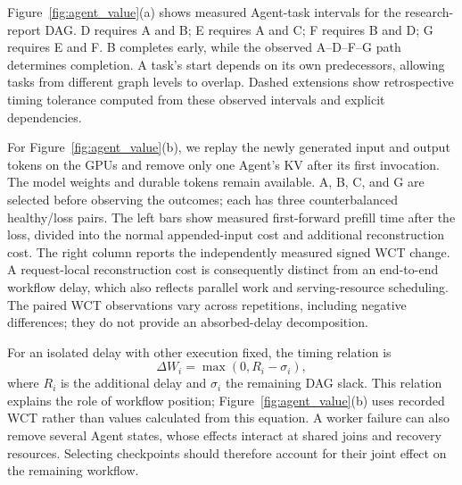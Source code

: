 Figure~\ref{fig:agent_value}(a) shows measured Agent-task intervals for the research-report DAG. D requires A and B; E requires A and C; F requires B and D; G requires E and F. B completes early, while the observed A--D--F--G path determines completion. A task's start depends on its own predecessors, allowing tasks from different graph levels to overlap. Dashed extensions show retrospective timing tolerance computed from these observed intervals and explicit dependencies.

For Figure~\ref{fig:agent_value}(b), we replay the newly generated input and output tokens on the GPUs and remove only one Agent's KV after its first invocation. The model weights and durable tokens remain available. A, B, C, and G are selected before observing the outcomes; each has three counterbalanced healthy/loss pairs. The left bars show measured first-forward prefill time after the loss, divided into the normal appended-input cost and additional reconstruction cost. The right column reports the independently measured signed WCT change. A request-local reconstruction cost is consequently distinct from an end-to-end workflow delay, which also reflects parallel work and serving-resource scheduling. The paired WCT observations vary across repetitions, including negative differences; they do not provide an absorbed-delay decomposition.

For an isolated delay with other execution fixed, the timing relation is
\begin{equation}
\Delta W_i=\max(0,R_i-\sigma_i),\label{eq:isolated_penalty}
\end{equation}
where $R_i$ is the additional delay and $\sigma_i$ the remaining DAG slack. This relation explains the role of workflow position; Figure~\ref{fig:agent_value}(b) uses recorded WCT rather than values calculated from this equation. A worker failure can also remove several Agent states, whose effects interact at shared joins and recovery resources. Selecting checkpoints should therefore account for their joint effect on the remaining workflow.

